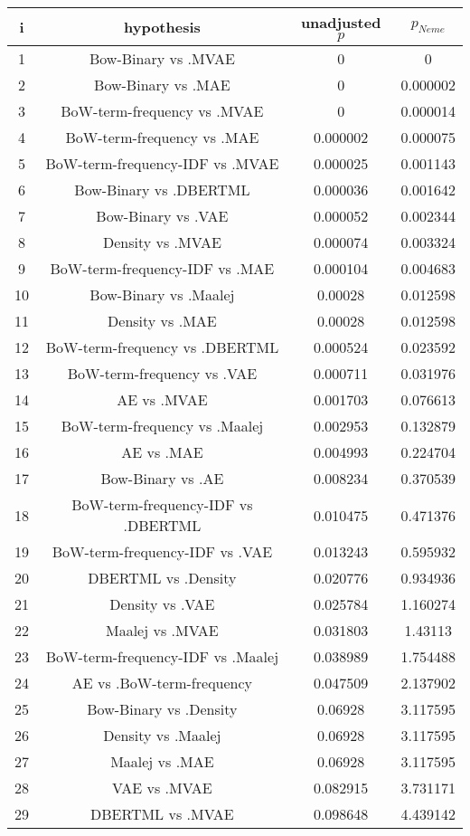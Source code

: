 \documentclass[a4paper,10pt]{article}
\begin{document}
\begin{landscape}
\begin{table}[!htp]
\centering\scriptsize
\begin{tabular}{cccc}
i&hypothesis&unadjusted $p$&$p_{Neme}$\\
\hline1&Bow-Binary vs .MVAE&0&0\\
2&Bow-Binary vs .MAE&0&0.000002\\
3&BoW-term-frequency vs .MVAE&0&0.000014\\
4&BoW-term-frequency vs .MAE&0.000002&0.000075\\
5&BoW-term-frequency-IDF vs .MVAE&0.000025&0.001143\\
6&Bow-Binary vs .DBERTML&0.000036&0.001642\\
7&Bow-Binary vs .VAE&0.000052&0.002344\\
8&Density vs .MVAE&0.000074&0.003324\\
9&BoW-term-frequency-IDF vs .MAE&0.000104&0.004683\\
10&Bow-Binary vs .Maalej&0.00028&0.012598\\
11&Density vs .MAE&0.00028&0.012598\\
12&BoW-term-frequency vs .DBERTML&0.000524&0.023592\\
13&BoW-term-frequency vs .VAE&0.000711&0.031976\\
14&AE vs .MVAE&0.001703&0.076613\\
15&BoW-term-frequency vs .Maalej&0.002953&0.132879\\
16&AE vs .MAE&0.004993&0.224704\\
17&Bow-Binary vs .AE&0.008234&0.370539\\
18&BoW-term-frequency-IDF vs .DBERTML&0.010475&0.471376\\
19&BoW-term-frequency-IDF vs .VAE&0.013243&0.595932\\
20&DBERTML vs .Density&0.020776&0.934936\\
21&Density vs .VAE&0.025784&1.160274\\
22&Maalej vs .MVAE&0.031803&1.43113\\
23&BoW-term-frequency-IDF vs .Maalej&0.038989&1.754488\\
24&AE vs .BoW-term-frequency&0.047509&2.137902\\
25&Bow-Binary vs .Density&0.06928&3.117595\\
26&Density vs .Maalej&0.06928&3.117595\\
27&Maalej vs .MAE&0.06928&3.117595\\
28&VAE vs .MVAE&0.082915&3.731171\\
29&DBERTML vs .MVAE&0.098648&4.439142\\

\end{tabular}
\end{table}
\end{landscape}
\end{document}
